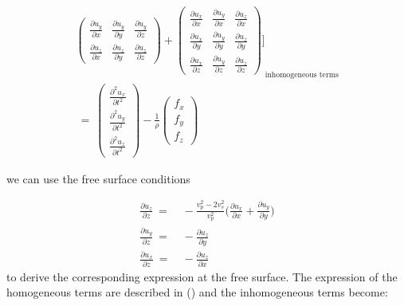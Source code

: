 \documentclass{article} %
\providecommand{\DIFdelbegin}{} %
\providecommand{\DIFdelend}{} %
\newcommand{\DIFscaledelfig}{0.5}
\newlength{\DIFdelgraphicswidth} %
\newlength{\DIFdelgraphicsheight} %
\newcommand{\DIFdelincludegraphics}[2][]{%
\sbox{\DIFdelgraphicsbox}{\DIFOincludegraphics[#1]{#2}}%
\settoboxwidth{\DIFdelgraphicswidth}{\DIFdelgraphicsbox} %
\settoboxtotalheight{\DIFdelgraphicsheight}{\DIFdelgraphicsbox} %
\scalebox{\DIFscaledelfig}{%
\parbox[b]{\DIFdelgraphicswidth}{\usebox{\DIFdelgraphicsbox}\\[-\baselineskip] \rule{\DIFdelgraphicswidth}{0em}}\llap{\resizebox{\DIFdelgraphicswidth}{\DIFdelgraphicsheight}{%
\setlength{\unitlength}{\DIFdelgraphicswidth}%
\begin{picture}(1,1)%
\thicklines\linethickness{2pt} %
{\color[rgb]{1,0,0}\put(0,0){\framebox(1,1){}}}%
{\color[rgb]{1,0,0}\put(0,0){\line( 1,1){1}}}%
{\color[rgb]{1,0,0}\put(0,1){\line(1,-1){1}}}%
\end{picture}%
}\hspace*{3pt}}} %
} %
\DeclareRobustCommand{\DIFdelbegin}{\DIFOdelbegin \let\includegraphics\DIFdelincludegraphics} %
\DeclareRobustCommand{\DIFdelend}{\DIFOaddend \let\includegraphics\DIFOincludegraphics} %
\begin{document}
\begin{align}
{\begin{pmatrix}
				\frac{\partial u_{y}}{\partial x} & \frac{\partial u_{y}}{\partial y} & \frac{\partial u_{y}}{\partial z}\\
				\frac{\partial u_{z}}{\partial x} & \frac{\partial u_{z}}{\partial y} & \frac{\partial u_{z}}{\partial z}
			\end{pmatrix}
			+
			\begin{pmatrix}
				\frac{\partial u_{x}}{\partial x} & \frac{\partial u_{y}}{\partial x} & \frac{\partial u_{z}}{\partial x}\\
				\frac{\partial u_{x}}{\partial y} & \frac{\partial u_{y}}{\partial y} & \frac{\partial u_{z}}{\partial y}\\
				\frac{\partial u_{x}}{\partial z} & \frac{\partial u_{y}}{\partial z} & \frac{\partial u_{z}}{\partial z}
			\end{pmatrix}
			\Bigg]}_\text{inhomogeneous terms} \\ \nonumber
		\: = \: 
		\begin{pmatrix}
			\frac{\partial^{2} u_{x}}{\partial t^{2}} \\
			\frac{\partial^{2} u_{y}}{\partial t^{2}} \\
			\frac{\partial^{2} u_{z}}{\partial t^{2}} 
		\end{pmatrix}
		- \frac{1}{\rho}
		\begin{pmatrix}
			f_{x}\\
			f_{y}\\
			f_{z}
		\end{pmatrix} %
		\label{eq4a_allterms}    
	\end{align} 

	we can use the free surface conditions 
	\DIFdelbegin %

\DIFdelend \begin{align}
		\frac{\partial u_{z}}{\partial z} \: =& \: - \frac{v_{p}^{2} - 2v_{s}^{2}}{v_{p}^{2}} \Big(\frac{\partial u_{x}}{\partial x} + \frac{\partial u_{y}}{\partial y}\Big)\\ 
		\frac{\partial u_{y}}{\partial z} \: =& \: - \frac{\partial u_{z}}{\partial y} \\
		\frac{\partial u_{x}}{\partial z} \: =& \: - \frac{\partial u_{z}}{\partial x}
	\end{align}\mbox{}
	to derive the corresponding expression at the free surface. The expression of the homogeneous terms are described in (\cite{curtis2002volumetric}) and the inhomogeneous terms become:
\end{document}
